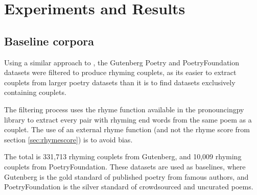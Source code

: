 \documentclass[11pt,a4paper]{article}
\begin{document}
\section{Experiments and Results}
\label{sec:results}

\subsection{Baseline corpora}
\label{sec:corpora}

Using a similar approach to \citet{cole}, the Gutenberg Poetry \cite{gutenbergpoetry} and PoetryFoundation \cite{poetryfoundationkaggle} datasets were filtered to produce rhyming couplets, as its easier to extract couplets from larger poetry datasets than it is to find datasets exclusively containing couplets.

The filtering process uses the rhyme function available in the pronouncingpy library to extract every pair with rhyming end words from the same poem as a couplet. The use of an external rhyme function (and not the rhyme score from section \ref{sec:rhymescore}) is to avoid bias.

The total is 331,713 rhyming couplets from Gutenberg, and 10,009 rhyming couplets from PoetryFoundation. These datasets are used as baselines, where Gutenberg is the gold standard of published poetry from famous authors, and PoetryFoundation is the silver standard of crowdsourced and uncurated poems.
\end{document}
